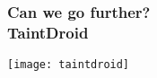 \begin{frame}
	\frametitle{Can we go further?\\TaintDroid}
	\vspace{-1.8cm}
	\centering
	\texttt{[image: taintdroid]}
\end{frame}